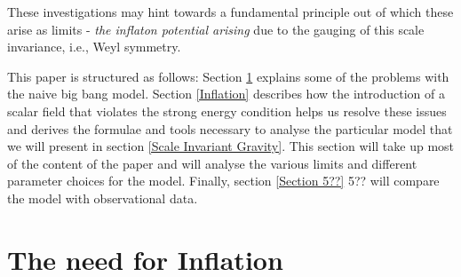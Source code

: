 \documentclass[aps,prd,reprint,preprintnumbers,showpacs,floatfix,nofootinbib,superscript address]{revtex4-2}
\begin{document}
These investigations may hint towards a fundamental principle out of which these arise as limits - \textit{the inflaton potential arising} due to the gauging of this scale invariance, i.e., Weyl symmetry.

This paper is structured as follows: Section \ref{The need for Inflation} explains some of the problems with the naive big bang model. Section \ref{Inflation} describes how the introduction of a scalar field that violates the strong energy condition helps us resolve these issues and derives the formulae and tools necessary to analyse the particular model that we will present in section \ref{Scale Invariant Gravity}. This section will take up most of the content of the paper and will analyse the various limits and different parameter choices for the model. Finally, section \ref{Section 5??} 5?? will compare the model with observational data.


\section{The need for Inflation}\label{The need for Inflation}
\end{document}
